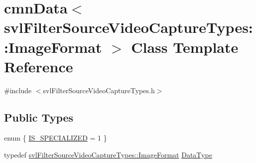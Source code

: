 \hypertarget{classcmn_data_3_01svl_filter_source_video_capture_types_1_1_image_format_01_4}{}\section{cmn\+Data$<$ svl\+Filter\+Source\+Video\+Capture\+Types\+:\+:Image\+Format $>$ Class Template Reference}
\label{classcmn_data_3_01svl_filter_source_video_capture_types_1_1_image_format_01_4}


{\ttfamily \#include $<$svl\+Filter\+Source\+Video\+Capture\+Types.\+h$>$}

\subsection*{Public Types}
\begin{DoxyCompactItemize}
\item 
enum \{ \hyperlink{classcmn_data_3_01svl_filter_source_video_capture_types_1_1_image_format_01_4_a33a5cfeab99bc16509a0c2f8a0b7218dabf991dde75ea0e092b74b6405ec0e683}{I\+S\+\_\+\+S\+P\+E\+C\+I\+A\+L\+I\+Z\+E\+D} = 1
 \}
\item 
typedef \hyperlink{classsvl_filter_source_video_capture_types_1_1_image_format}{svl\+Filter\+Source\+Video\+Capture\+Types\+::\+Image\+Format} \hyperlink{classcmn_data_3_01svl_filter_source_video_capture_types_1_1_image_format_01_4_addfc3b80307fd56e73fbbf1f6eb63edb}{Data\+Type}
\end{DoxyCompactItemize}
